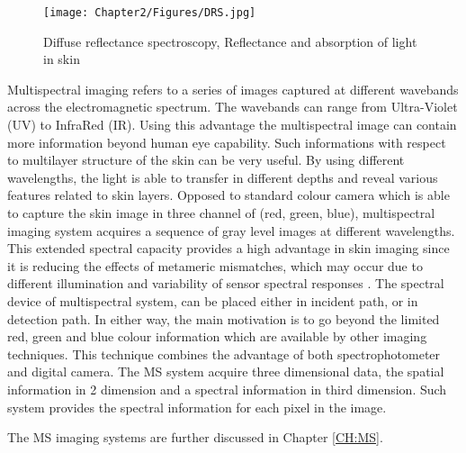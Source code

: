 		\begin{figure}
		\centering
		\texttt{[image: Chapter2/Figures/DRS.jpg]}	
		\caption{Diffuse reflectance spectroscopy, Reflectance and absorption of light in skin}
		\label{fig:DRS}
		\end{figure}
	
	Multispectral imaging refers to a series of images captured at different wavebands across the electromagnetic spectrum. The wavebands can range from Ultra-Violet (UV) to InfraRed (IR). Using this advantage the multispectral image can contain more information beyond human eye capability. Such informations with respect to multilayer structure of the skin can be very useful. By using different wavelengths, the light is able to transfer in different depths and reveal various features related to skin layers.
Opposed to standard colour camera which is able to capture the skin image in three channel of (red, green, blue), multispectral imaging system acquires a sequence of gray level images at different wavelengths. This extended spectral capacity provides a high advantage in skin imaging since it is reducing the effects of metameric mismatches, which may occur due to different illumination and variability of sensor spectral responses \cite{jolivot2011developpement}.
	The spectral device of multispectral system, can be placed either in incident path, or in detection path. In either way, the main motivation is to go beyond the limited red, green and blue colour information which are available by other imaging techniques. This technique combines the advantage of both spectrophotometer and digital camera. The MS system acquire three dimensional data, the spatial information in 2 dimension and a spectral information in third dimension. Such system provides the spectral information for each pixel in the image. 	
	
	
	The MS imaging systems are further discussed in Chapter \ref{CH:MS}.


